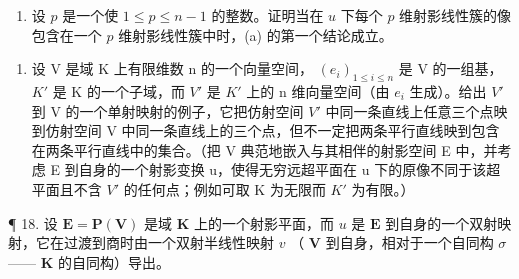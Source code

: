 \begin{enumerate}
\def\labelenumi{(\alph{enumi})}
\setcounter{enumi}{1}
\tightlist
\item
  设 \(p\) 是一个使 \(1 \leqslant p \leqslant n - 1\) 的整数。证明当在 \(u\) 下每个 \(p\) 维射影线性簇的像包含在一个 \(p\) 维射影线性簇中时，(a) 的第一个结论成立。
\end{enumerate}

\begin{enumerate}
\def\labelenumi{\arabic{enumi}.}
\setcounter{enumi}{16}
\tightlist
\item
  设 V 是域 K 上有限维数 n 的一个向量空间， \((e_{i})_{1\leq i\leq n}\) 是 V 的一组基， \(K'\) 是 K 的一个子域，而 \(V'\) 是 \(K'\) 上的 n 维向量空间（由 \(e_{i}\) 生成）。给出 \(V'\) 到 V 的一个单射映射的例子，它把仿射空间 \(V'\) 中同一条直线上任意三个点映到仿射空间 V 中同一条直线上的三个点，但不一定把两条平行直线映到包含在两条平行直线中的集合。（把 V 典范地嵌入与其相伴的射影空间 E 中，并考虑 E 到自身的一个射影变换 u，使得无穷远超平面在 u 下的原像不同于该超平面且不含 \(V'\) 的任何点；例如可取 K 为无限而 \(K'\) 为有限。）
\end{enumerate}

¶ 18. 设 \(\mathbf{E} = \mathbf{P}(\mathbf{V})\) 是域 \(\mathbf{K}\) 上的一个射影平面，而 \(u\) 是 \(\mathbf{E}\) 到自身的一个双射映射，它在过渡到商时由一个双射半线性映射 \(v\) （ \(\mathbf{V}\) 到自身，相对于一个自同构 \(\sigma\) —— \(\mathbf{K}\) 的自同构）导出。

